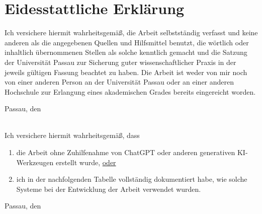 \chapter*{Eidesstattliche Erklärung}
\label{ch:Declaration}

Ich versichere hiermit wahrheitsgemäß, die Arbeit selbstständig verfasst und keine anderen als die angegebenen Quellen und Hilfsmittel benutzt, die wörtlich oder inhaltlich übernommenen Stellen als solche kenntlich gemacht und die Satzung der Universität Passau zur Sicherung guter wissenschaftlicher Praxis in der jeweils gültigen Fassung beachtet zu haben. Die Arbeit ist weder von mir noch von einer anderen Person an der Universität Passau oder an einer anderen Hochschule zur Erlangung eines akademischen Grades bereits eingereicht worden.

\vspace*{1cm}
\hspace*{4cm} Passau, den \submissiontime \hspace*{0.5cm}\hrulefill \\
\hspace*{10.5cm} \myname \\
\vspace*{1cm}

Ich versichere hiermit wahrheitsgemäß, dass
\begin{enumerate}
\item[\text{\ding{113}}] die Arbeit ohne Zuhilfenahme von ChatGPT oder anderen generativen KI-Werkzeugen erstellt wurde, \underline{oder}
\item[\text{\ding{113}}] ich in der nachfolgenden Tabelle vollständig dokumentiert habe, wie solche Systeme bei der Entwicklung der Arbeit verwendet wurden.
\end{enumerate}

\vspace*{1cm}
\hspace*{4cm} Passau, den \submissiontime \hspace*{0.5cm}\hrulefill \\
\hspace*{10.5cm} \myname \\


\newpage

